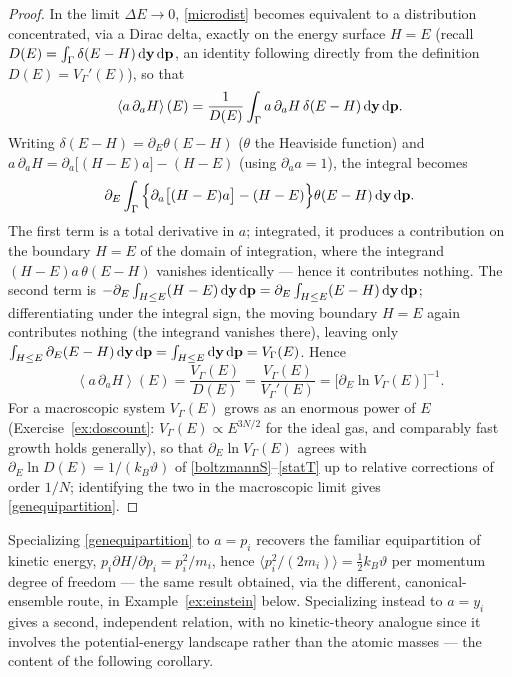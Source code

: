 \begin{proof}
	In the limit $\Delta E\to0$, \eqref{microdist} becomes equivalent to a distribution concentrated, via a Dirac delta, exactly on the energy surface $H=E$ (recall $D(E)=\int_\Gamma\delta(E-H)\,\mathrm{d}\mathbf{y}\,\mathrm{d}\mathbf{p}$, an identity following directly from the definition $D(E)=V_\Gamma'(E)$), so that
	\begin{equation}
		\left\langle a\,\partial_aH\right\rangle(E) = \frac{1}{D(E)}\int_\Gamma a\,\partial_aH\,\delta(E-H)\,\mathrm{d}\mathbf{y}\,\mathrm{d}\mathbf{p}.
	\end{equation}
	Writing $\delta(E-H)=\partial_E\theta(E-H)$ ($\theta$ the Heaviside function) and $a\,\partial_aH=\partial_a\big[(H-E)a\big]-(H-E)$ (using $\partial_aa=1$), the integral becomes
	\begin{equation}
		\partial_E\int_\Gamma\Big\{\partial_a\big[(H-E)a\big] - (H-E)\Big\}\theta(E-H)\,\mathrm{d}\mathbf{y}\,\mathrm{d}\mathbf{p}.
	\end{equation}
	The first term is a total derivative in $a$; integrated, it produces a contribution on the boundary $H=E$ of the domain of integration, where the integrand $(H-E)a\,\theta(E-H)$ vanishes identically --- hence it contributes nothing. The second term is $-\partial_E\int_{H\leq E}(H-E)\,\mathrm{d}\mathbf{y}\,\mathrm{d}\mathbf{p}=\partial_E\int_{H\leq E}(E-H)\,\mathrm{d}\mathbf{y}\,\mathrm{d}\mathbf{p}$; differentiating under the integral sign, the moving boundary $H=E$ again contributes nothing (the integrand vanishes there), leaving only $\int_{H\leq E}\partial_E(E-H)\,\mathrm{d}\mathbf{y}\,\mathrm{d}\mathbf{p}=\int_{H\leq E}\mathrm{d}\mathbf{y}\,\mathrm{d}\mathbf{p}=V_\Gamma(E)$. Hence
	\begin{equation}
		\left\langle a\,\partial_aH\right\rangle(E) = \frac{V_\Gamma(E)}{D(E)} = \frac{V_\Gamma(E)}{V_\Gamma'(E)} = \big[\partial_E\ln V_\Gamma(E)\big]^{-1}.
	\end{equation}
	For a macroscopic system $V_\Gamma(E)$ grows as an enormous power of $E$ (Exercise~\ref{ex:doscount}: $V_\Gamma(E)\propto E^{3N/2}$ for the ideal gas, and comparably fast growth holds generally), so that $\partial_E\ln V_\Gamma(E)$ agrees with $\partial_E\ln D(E)=1/(k_B\vartheta)$ of \eqref{boltzmannS}--\eqref{statT} up to relative corrections of order $1/N$; identifying the two in the macroscopic limit gives \eqref{genequipartition}.
\end{proof}

\begin{remark}
	Specializing \eqref{genequipartition} to $a=p_i$ recovers the familiar equipartition of kinetic energy, $p_i\partial H/\partial p_i=p_i^2/m_i$, hence $\langle p_i^2/(2m_i)\rangle=\tfrac12k_B\vartheta$ per momentum degree of freedom --- the same result obtained, via the different, canonical-ensemble route, in Example~\ref{ex:einstein} below. Specializing instead to $a=y_i$ gives a second, independent relation, with no kinetic-theory analogue since it involves the potential-energy landscape rather than the atomic masses --- the content of the following corollary.
\end{remark}

